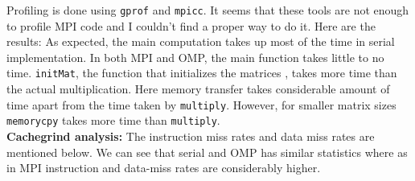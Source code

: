 \documentclass{article}
\begin{document}
Profiling is done using \verb|gprof| and \verb|mpicc|. It seems
that these tools are not enough to profile MPI code and I couldn't find 
a proper way to do it. Here are the results:
As expected, the main computation takes up most of the time 
in serial implementation.
In both MPI and OMP, the main function takes little to no time.
\verb|initMat|, the function that initializes the matrices
, takes more time than the actual multiplication. 
Here memory transfer takes considerable amount of time
apart from the time taken by \verb|multiply|. However, for smaller 
matrix sizes \verb|memorycpy| takes more time 
than \verb|multiply|. 
\\
\newpage
\textbf{Cachegrind analysis:} The instruction miss rates and data miss rates
are mentioned below. We can see that serial and OMP has similar statistics
where as in MPI instruction and data-miss rates are considerably higher.

\end{document}
